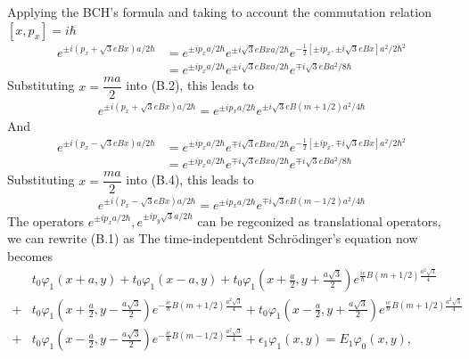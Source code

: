 \documentclass{report}
\newcommand{\f}[2]{\dfrac{#1}{#2}}
\begin{document}
Applying the BCH's formula and taking to account the commutation relation $\left[x,p_{x}\right] = i \hbar$
\begin{equation}
	\begin{aligned}
		e^{\pm i(p_{x} + \sqrt{3} e B x) a / 2\hbar}
		 & = e^{\pm i p_{x} a / 2 \hbar} e^{\pm i\sqrt{3} e B x a / 2 \hbar} e^{-\frac{1}{2} \left[\pm i p_{x}, \pm i \sqrt{3} e B x\right] a^{2} / 2 \hbar^{2}} \\
		 & = e^{\pm i p_{x} a / 2 \hbar} e^{\pm i\sqrt{3} e B x a / 2 \hbar} e^{\mp i \sqrt{3} e B a^{2} / 8 \hbar}
	\end{aligned}
\end{equation}
Substituting $x = \f{ma}{2}$ into (B.2), this leads to
\begin{gather}
	e^{\pm i(p_{x} + \sqrt{3} e B x) a / 2\hbar}
	= e^{\pm i p_{x} a / 2 \hbar} e^{\pm i\sqrt{3} e B (m + 1 /2) a^{2} / 4 \hbar}
\end{gather}
And
\begin{equation}
	\begin{aligned}
		e^{\pm i(p_{x} - \sqrt{3} e B x) a / 2\hbar}
		 & = e^{\pm i p_{x} a / 2 \hbar} e^{\mp i\sqrt{3} e B x a / 2 \hbar} e^{-\frac{1}{2} \left[\pm i p_{x}, \mp i \sqrt{3} e B x\right] a^{2} / 2 \hbar^{2}} \\
		 & = e^{\pm i p_{x} a / 2 \hbar} e^{\mp i\sqrt{3} e B x a / 2 \hbar} e^{\mp i \sqrt{3} e B a^{2} / 8 \hbar}
	\end{aligned}
\end{equation}
Substituting $x = \f{ma}{2}$ into (B.4), this leads to
\begin{gather}
	e^{\pm i(p_{x} - \sqrt{3} e B x) a / 2\hbar}
	= e^{\pm i p_{x} a / 2 \hbar} e^{\mp i\sqrt{3} e B (m - 1 /2) a^{2} / 4 \hbar}
\end{gather}
The operators $e^{\pm i p_{x} a / 2 \hbar}, e^{\pm i p_{y} \sqrt{3}a / 2 \hbar}$ can be regconized as translational operators, we can rewrite (B.1) as
The time-indepentdent Schr\"{o}dinger's equation now becomes
\begin{equation}
	\begin{aligned}
		  & t_{0} \varphi_{1} (x + a,y) + t_{0}\varphi_{1} (x - a,y) + t_{0}\varphi_{1} (x + \frac{a}{2},y + \frac{a\sqrt{3}}{2}) e^{\frac{ie}{\hbar}B(m + 1 /2) \frac{a^{2}\sqrt{3}}{4}}                                                            \\
		+ & t_{0} \varphi_{1} (x + \frac{a}{2},y - \frac{a\sqrt{3}}{2}) e^{-\frac{ie}{\hbar}B(m + 1/2) \frac{a^{2}\sqrt{3}}{4}} + t_{0} \varphi_{1} (x - \frac{a}{2},y + \frac{a\sqrt{3}}{2}) e^{\frac{ie}{\hbar}B(m + 1/2) \frac{a^{2}\sqrt{3}}{4}} \\
		+ & t_{0} \varphi_{1} (x - \frac{a}{2},y - \frac{a\sqrt{3}}{2}) e^{-\frac{ie}{\hbar}B(m - 1/2) \frac{a^{2}\sqrt{3}}{4}} + \epsilon_{1} \varphi_{1}(x,y) = E_{1} \varphi_{0}(x,y),
	\end{aligned}
\end{equation}
\end{document}
